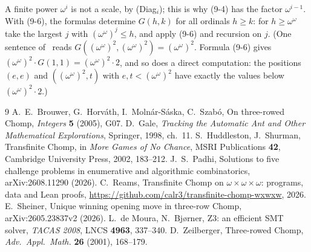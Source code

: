 \documentclass[11pt]{amsart}
\theoremstyle{definition}
\theoremstyle{remark}
\newcommand{\G}{G}
\begin{document}
A finite power $\omega^i$ is not a scale, by (Diag$_i$); this is why (9-4) has the factor
$\omega^{i-1}$. With (9-6), the formulas determine $\G(h,k)$ for all ordinals $h\ge k$: for
$h\ge\omega^\omega$ take the largest $j$ with $(\omega^\omega)^j\le h$, and apply (9-6) and
recursion on $j$. (One sentence of~\cite[\S9]{HS} reads
$\G((\omega^\omega)^2,(\omega^\omega)^2)=(\omega^\omega)^2$. Formula (9-6) gives
$(\omega^\omega)^2\cdot\G(1,1)=(\omega^\omega)^2\cdot2$, and so does a direct computation: the
positions $(e,e)$ and $((\omega^\omega)^2,t)$ with $e,t<(\omega^\omega)^2$ have exactly the
values below $(\omega^\omega)^2\cdot2$.)

\begin{thebibliography}{9}
 A.~E.~Brouwer, G.~Horv\'ath, I.~Moln\'ar-S\'aska, C.~Szab\'o, On three-rowed
  Chomp, \emph{Integers} \textbf{5} (2005), G07.
 D.~Gale, \emph{Tracking the Automatic Ant and Other Mathematical Explorations},
  Springer, 1998, ch.~11.
 S.~Huddleston, J.~Shurman, Transfinite Chomp, in \emph{More Games of No Chance},
  MSRI Publications \textbf{42}, Cambridge University Press, 2002, 183--212.
 J.~S.~Padhi, Solutions to five challenge problems in enumerative and algorithmic
  combinatorics, arXiv:2608.11290 (2026).
 C.~Reams, Transfinite Chomp on $\omega\times\omega\times\omega$: programs, data and
  Lean proofs, \url{https://github.com/calr3/transfinite-chomp-wxwxw}, 2026.
 E.~Sheiner, Unique winning opening move in three-row Chomp, arXiv:2605.23837v2
  (2026).
 L.~de Moura, N.~Bj{\o}rner, Z3: an efficient SMT solver, \emph{TACAS 2008},
  LNCS \textbf{4963}, 337--340.
 D.~Zeilberger, Three-rowed Chomp, \emph{Adv.\ Appl.\ Math.} \textbf{26} (2001),
  168--179.
\end{thebibliography}
\end{document}
